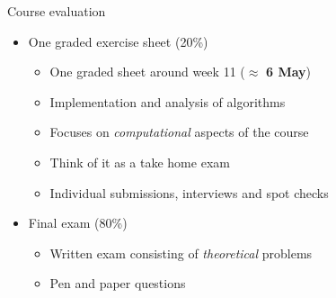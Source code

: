 \begin{frame}{Course evaluation}
    \begin{itemize}
        \item One graded exercise sheet \alert{(20\%)}
            \begin{itemize}
                \item \alert{One graded sheet}
                    around week 11 ($\approx$ \textbf{6 May})
                \item \alert{Implementation and analysis of algorithms}
                \item Focuses on \textit{computational} aspects of the course
                \item Think of it as a \alert{take home exam}
                \item Individual submissions, interviews and spot checks
            \end{itemize}
        \vspace{2em}
        \item Final exam \alert{(80\%)}
            \begin{itemize}
                \item \alert{Written exam}
                    consisting of \textit{theoretical} problems
                \item Pen and paper questions
            \end{itemize}
    \end{itemize}
\end{frame}

